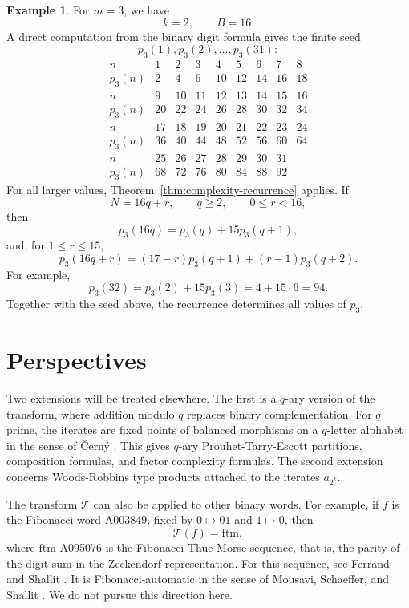 \documentclass[12pt,reqno]{article}
\newcommand{\seqnum}[1]{\href{https://oeis.org/#1}{\rm \underline{#1}}}
\theoremstyle{plain}
\theoremstyle{definition}
\newtheorem{example}[theorem]{Example}
\begin{document}
\begin{example}
\label{ex:m3-complete}
For \(m=3\), we have
\[
  k=2,\qquad B=16.
\]
A direct computation from the binary digit formula gives the finite seed
\[
  p_3(1),p_3(2),\ldots,p_3(31):
\]
\[
\begin{array}{c|rrrrrrrr}
n        &1&2&3&4&5&6&7&8\\
\hline
p_3(n)   &2&4&6&10&12&14&16&18\\[2mm]
n        &9&10&11&12&13&14&15&16\\
\hline
p_3(n)   &20&22&24&26&28&30&32&34\\[2mm]
n        &17&18&19&20&21&22&23&24\\
\hline
p_3(n)   &36&40&44&48&52&56&60&64\\[2mm]
n        &25&26&27&28&29&30&31\\
\hline
p_3(n)   &68&72&76&80&84&88&92
\end{array}
\]
For all larger values, Theorem~\ref{thm:complexity-recurrence} applies.
If
\[
  N=16q+r,\qquad q\ge2,\qquad 0\le r<16,
\]
then
\[
  p_3(16q)=p_3(q)+15p_3(q+1),
\]
and, for \(1\le r\le15\),
\[
  p_3(16q+r)=(17-r)p_3(q+1)+(r-1)p_3(q+2).
\]
For example,
\[
  p_3(32)=p_3(2)+15p_3(3)=4+15\cdot6=94.
\]
Together with the seed above, the recurrence determines all values of
\(p_3\).
\end{example}

\section*{Perspectives}

Two extensions will be treated elsewhere. The first is a $q$-ary version of the transform, where addition modulo $q$ replaces binary complementation. For $q$ prime, the iterates are fixed points of balanced morphisms on a $q$-letter alphabet in the sense of \v{C}ern\'y \cite{Cerny2013, Cerny2017}. This gives $q$-ary Prouhet-Tarry-Escott partitions, composition formulas, and factor complexity formulas. The second extension concerns Woods-Robbins type products attached to the iterates $a_{2^k}$.

The transform $\mathcal{T}$ can also be applied to other binary words. For example, if $f$ is the Fibonacci word \seqnum{A003849}, fixed by $0 \mapsto 01$ and $1 \mapsto 0$, then
\[
  \mathcal{T}(f) = \mathrm{ftm},
\]
where $\mathrm{ftm}$ \seqnum{A095076} is the Fibonacci-Thue-Morse sequence, that is, the parity of the digit sum in the Zeckendorf representation. For this sequence, see Ferrand \cite{Ferrand2007} and Shallit \cite{ShallitFibo2022, ShallitFiboComplexity2021}. It is Fibonacci-automatic in the sense of Mousavi, Schaeffer, and Shallit \cite{MousaviSchaefferShallit2016}. We do not pursue this direction here.
\end{document}
